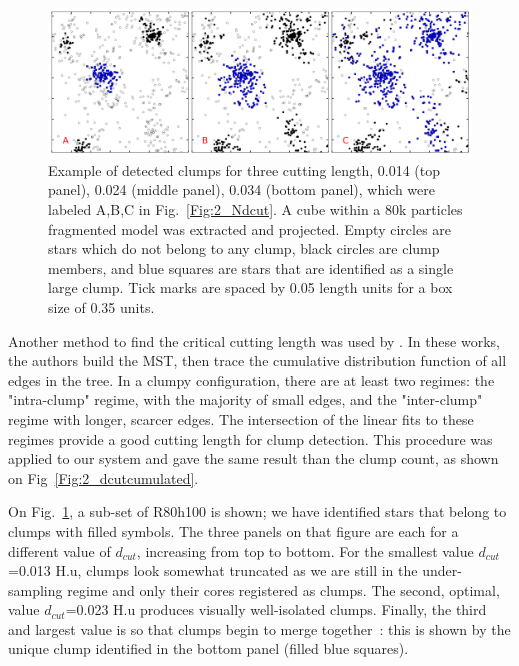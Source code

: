  

 


\begin{figure}
\begin{center}
\includegraphics[width=\columnwidth]{Figures/2_clumpsABC.png}
\end{center}
\caption{Example of detected clumps for three cutting length, 0.014 (top panel), 0.024 (middle panel), 0.034 (bottom panel), which were labeled A,B,C  in Fig.~\ref{Fig:2_Ndcut}. A cube within a 80k particles fragmented model was extracted and projected.  Empty circles are stars which do not belong to any clump, black circles are clump members, and blue squares are stars that are identified as a single large  clump. Tick marks are spaced by 0.05 length units for a box size of 0.35 units.}
\label{Fig:2_clumpsABC}
\end{figure} 




Another method to find the critical cutting length was used by \cite{Gutermuth2009,Kirk2011}. In these works, the authors build the MST, then trace the cumulative distribution function of all edges in the tree. In a clumpy configuration, there are at least two regimes: the "intra-clump" regime, with the majority of small edges, and the "inter-clump" regime with longer, scarcer edges. The intersection of the linear fits to these regimes provide a good cutting length for clump detection. This procedure was applied to our system and gave the same result than the clump count, as shown on Fig~\ref{Fig:2_dcutcumulated}.

 
   On Fig.~\ref{Fig:2_clumpsABC}, a sub-set of R80h100 is shown; we have identified stars that belong to clumps with filled symbols. The three panels on that figure are each for a different value of $d_{cut}$, increasing from top to bottom. For the smallest value $d_{cut}$=0.013 H.u, clumps look somewhat truncated as we are still in the under-sampling regime and only their cores registered as clumps. The second, optimal, value $d_{cut}$=0.023 H.u produces visually well-isolated clumps. Finally, the third and  largest value is so that clumps begin to merge together~: this is shown by the unique clump identified in the bottom panel (filled blue squares).
   
